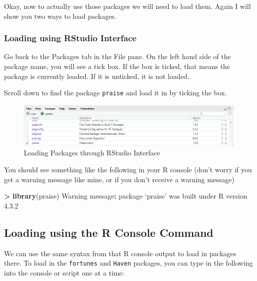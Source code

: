 \documentclass[
]{book}
\newenvironment{Shaded}{\begin{snugshade}}{\end{snugshade}}
\newcommand{\DecValTok}[1]{\textcolor[rgb]{0.00,0.00,0.81}{#1}}
\newcommand{\FloatTok}[1]{\textcolor[rgb]{0.00,0.00,0.81}{#1}}
\newcommand{\FunctionTok}[1]{\textcolor[rgb]{0.13,0.29,0.53}{\textbf{#1}}}
\newcommand{\NormalTok}[1]{#1}
\newcommand{\SpecialCharTok}[1]{\textcolor[rgb]{0.81,0.36,0.00}{\textbf{#1}}}
\begin{document}
Okay, now to actually use those packages we will need to load them. Again I will show you two ways to load packages.

\hypertarget{loading-using-rstudio-interface}{%
\subsubsection{Loading using RStudio Interface}\label{loading-using-rstudio-interface}}

Go back to the Packages tab in the File pane. On the left hand side of the package name, you will see a tick box. If the box is ticked, that means the package is currently loaded. If it is unticked, it is not loaded.

Scroll down to find the package \texttt{praise} and load it in by ticking the box.

\begin{figure}
\centering
\includegraphics{img/04-praise-loaded.png}
\caption{\label{fig:unnamed-chunk-151}Loading Packages through RStudio Interface}
\end{figure}

You should see something like the following in your R console (don't worry if you get a warning message like mine, or if you don't receive a warning message)

\begin{Shaded}
\begin{Highlighting}[]
\SpecialCharTok{\textgreater{}} \FunctionTok{library}\NormalTok{(praise)}
\NormalTok{Warning message}\SpecialCharTok{:}
\NormalTok{package ‘praise’ was built under R version }\DecValTok{4}\NormalTok{.}\FloatTok{3.2} 
\end{Highlighting}
\end{Shaded}

\hypertarget{loading-using-the-r-console-command}{%
\subsection{Loading using the R Console Command}\label{loading-using-the-r-console-command}}

We can use the same syntax from that R console output to load in packages there. To load in the \texttt{fortunes} and \texttt{Haven} packages, you can type in the following into the console or script one at a time:
\end{document}
